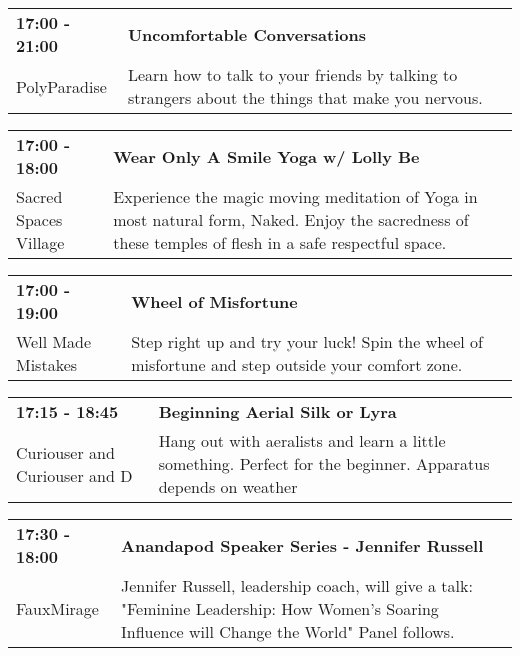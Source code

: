 \begin{tabular}{ p{1in} p{2.2in} }
    \textbf{17:00 - 21:00} & \textbf{Uncomfortable Conversations} \\
    PolyParadise \newline  & Learn how to talk to your friends by talking to strangers about the things that make you nervous. \\
    \hline 
\end{tabular}
    
\begin{tabular}{ p{1in} p{2.2in} }
    \textbf{17:00 - 18:00} & \textbf{Wear Only A Smile Yoga w/ Lolly Be} \\
    Sacred Spaces Village \newline  & Experience the magic moving meditation of Yoga in most natural form, Naked. Enjoy the sacredness of these temples of flesh in a safe respectful space. \\
    \hline 
\end{tabular}
    
\begin{tabular}{ p{1in} p{2.2in} }
    \textbf{17:00 - 19:00} & \textbf{Wheel of Misfortune} \\
    Well Made Mistakes \newline  & Step right up and try your luck! Spin the wheel of misfortune and step outside your comfort zone. \\
    \hline 
\end{tabular}
    
\begin{tabular}{ p{1in} p{2.2in} }
    \textbf{17:15 - 18:45} & \textbf{Beginning Aerial Silk or Lyra} \\
    Curiouser and Curiouser \newline 9 and D & Hang out with aeralists and learn a little something. Perfect for the beginner. Apparatus depends on weather \\
    \hline 
\end{tabular}
    
\begin{tabular}{ p{1in} p{2.2in} }
    \textbf{17:30 - 18:00} & \textbf{Anandapod Speaker Series - Jennifer Russell} \\
    FauxMirage \newline  & Jennifer Russell, leadership coach, will give a talk: "Feminine Leadership: How Women's Soaring Influence will Change the World"  Panel follows. \\
    \hline 
\end{tabular}
    

